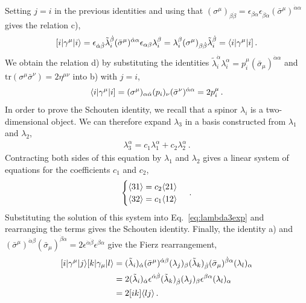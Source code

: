 Setting $j=i$ in the previous identities and using that $(\sigma^{\mu})_{\beta\dot{\beta}} = \epsilon_{\beta\alpha} \epsilon_{\dot{\beta}\dot{\alpha}} (\bar{\sigma}^{\mu})^{\dot{\alpha}\alpha}$ gives the relation c),
\begin{align}
[ i | \gamma^{\mu} | i \rangle = \epsilon_{\dot{\alpha}\dot{\beta}}  \tilde{\lambda}_i^{\dot\beta} (\bar{\sigma}^{\mu})^{\dot{\alpha} \alpha} \epsilon_{\alpha \beta} \lambda_i^{\beta} = \lambda_i^{\beta} (\sigma^{\mu})_{\beta \dot{\beta}} \tilde{\lambda}_i^{\dot{\beta}} = \langle i | \gamma^{\mu} | i ] \,.
\end{align}
We obtain the relation d) by substituting the identities $\tilde{\lambda}_i^{\dot{\alpha}} \lambda_i^{\alpha} = p_i^{\mu} (\bar{\sigma}_{\mu})^{\dot{\alpha}\alpha}$
and $\text{tr}\left(\sigma^{\mu} \bar{\sigma}^{\nu}\right) = 2 \eta^{\mu\nu}$ into b) with $j=i$,
\begin{align}
\langle i | \gamma^{\mu} | i ] =  (\sigma^{\mu})_{\alpha\dot{\alpha}} (p_i)_{\nu} (\bar{\sigma}^{\nu})^{\dot\alpha \alpha} = 2 p_i^{\mu} \,.
\end{align}
In order to prove the Schouten identity, we recall that a spinor $\lambda_i$ is a two-dimensional object. We can therefore expand $\lambda_3$ in a basis constructed from $\lambda_1$ and $\lambda_2$,
\begin{align} \label{eq:lambda3exp}
\lambda_3^{\alpha} = c_1 \lambda_1^{\alpha} + c_2 \lambda_2^{\alpha} \,.
\end{align}
Contracting both sides of this equation by $\lambda_1$ and $\lambda_2$ gives a linear system of equations for the coefficients $c_1$ and $c_2$,
\begin{align}
\begin{cases} \langle 3 1 \rangle = c_2 \langle 2 1 \rangle \\
\langle 3 2 \rangle = c_1 \langle 1 2 \rangle \\
\end{cases}\,.
\end{align}
Substituting the solution of this system into Eq.~\eqref{eq:lambda3exp} and rearranging the terms gives the Schouten identity.
Finally, the identity a) and $(\bar{\sigma}^{\mu})^{\dot{\alpha} \beta} (\bar{\sigma}_{\mu})^{\dot{\beta} \alpha} = 2  \epsilon^{\dot{\alpha}\dot{\beta}}  \epsilon^{\beta \alpha}$ give the Fierz rearrangement, 
\begin{align}
\begin{aligned}
\spBA{i}{\gamma^{\mu}}{j} \spBA{k}{\gamma_{\mu}}{l} & = (\tilde{\lambda}_i)_{\dot{\alpha}} (\bar{\sigma}^{\mu})^{\dot{\alpha} \beta} (\lambda_j)_{\beta} 
  (\tilde{\lambda}_k)_{\dot{\beta}} (\bar{\sigma}_{\mu})^{\dot{\beta} \alpha} (\lambda_l)_{\alpha} \\
& = 2 (\tilde{\lambda}_i)_{\dot{\alpha}} \epsilon^{\dot{\alpha}\dot{\beta}} (\tilde{\lambda}_k)_{\dot{\beta}}
  (\lambda_j)_{\beta}  \epsilon^{\beta \alpha} (\lambda_l)_{\alpha} \\
& = 2  \spB ik \spA lj \,.
\end{aligned}
\end{align}


